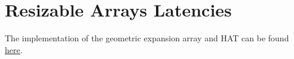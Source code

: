 \section{Resizable Arrays Latencies}

\begin{tcolorbox}
	The implementation of the geometric expansion array and HAT can be found \href{https://github.com/nngerncham/cs315_apal/tree/main/assignments/asn01/01-better-resizable-arrays}{here}.
\end{tcolorbox}





